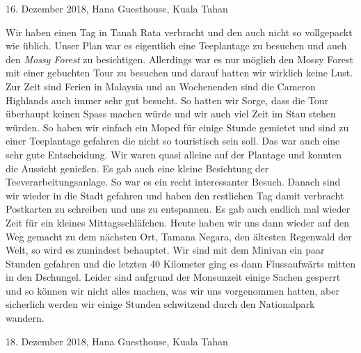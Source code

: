 \documentclass[11pt]{book}
\begin{document}
16. Dezember 2018, Hana Guesthouse, Kuala Tahan

Wir haben einen Tag in Tanah Rata verbracht und den auch nicht so vollgepackt wie üblich. Unser Plan war es eigentlich eine Teeplantage 
zu besuchen und auch den \emph{Mossy Forest} zu besichtigen. Allerdings war es nur möglich den Mossy Forest mit einer gebuchten 
Tour zu besuchen und darauf hatten wir wirklich keine Lust. Zur Zeit sind Ferien in Malaysia und an Wochenenden sind die Cameron 
Highlands auch immer sehr gut besucht. So hatten wir Sorge, dass die Tour überhaupt keinen Spass machen würde und wir auch viel Zeit 
im Stau stehen würden. So haben wir einfach ein Moped für einige Stunde gemietet und sind zu einer Teeplantage gefahren die nicht 
so touristisch sein soll. Das war auch eine sehr gute Entscheidung. Wir waren quasi alleine auf der Plantage und konnten die Aussicht 
genießen. Es gab auch eine kleine Besichtung der Teeverarbeitungsanlage. So war es ein recht interessanter Besuch. Danach sind wir wieder 
in die Stadt gefahren und haben den restlichen Tag damit verbracht Postkarten zu schreiben und uns zu entspannen. Es gab auch endlich 
mal wieder Zeit für ein kleines Mittagsschläfchen. 
Heute haben wir uns dann wieder auf den Weg gemacht zu dem nächsten Ort, Tamana Negara, den ältesten Regenwald der Welt, so wird 
es zumindest behauptet. Wir sind mit dem Minivan ein paar Stunden gefahren und die letzten 40 Kilometer ging es dann Flussaufwärts 
mitten in den Dschungel. Leider sind aufgrund der Monsunzeit einige Sachen gesperrt und so können wir nicht alles machen, was wir 
uns vorgenommen hatten, aber sicherlich werden wir einige Stunden schwitzend durch den Nationalpark wandern.

18. Dezember 2018, Hana Guesthouse, Kuala Tahan
\end{document}
